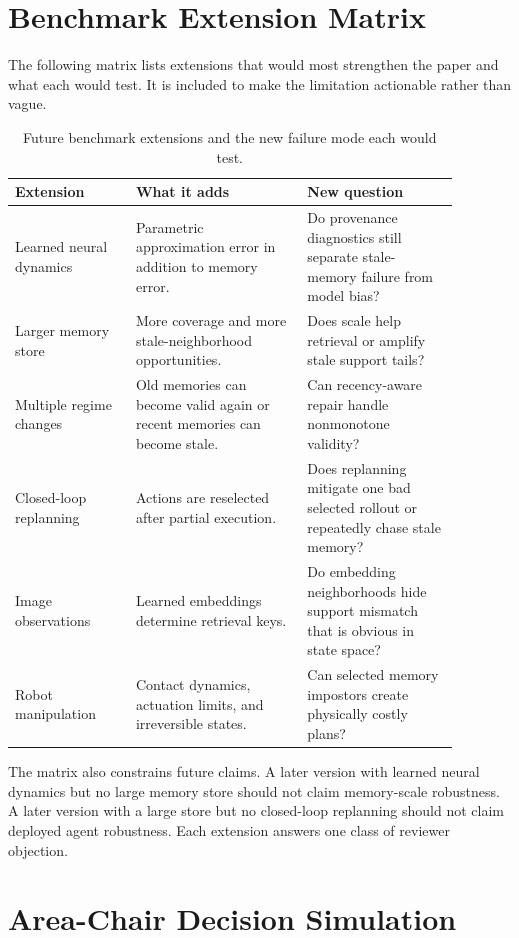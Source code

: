 \documentclass{article}
\begin{document}
\section{Benchmark Extension Matrix}
\label{app:extension-matrix}

The following matrix lists extensions that would most strengthen the paper and
what each would test. It is included to make the limitation actionable rather
than vague.

\begin{table}[t]
\centering
\small
\caption{Future benchmark extensions and the new failure mode each would test.}
\label{tab:extension-matrix}
\begin{tabular}{p{0.24\linewidth}p{0.34\linewidth}p{0.30\linewidth}}
\toprule
Extension & What it adds & New question \\
\midrule
Learned neural dynamics &
Parametric approximation error in addition to memory error. &
Do provenance diagnostics still separate stale-memory failure from model bias? \\
Larger memory store &
More coverage and more stale-neighborhood opportunities. &
Does scale help retrieval or amplify stale support tails? \\
Multiple regime changes &
Old memories can become valid again or recent memories can become stale. &
Can recency-aware repair handle nonmonotone validity? \\
Closed-loop replanning &
Actions are reselected after partial execution. &
Does replanning mitigate one bad selected rollout or repeatedly chase stale
memory? \\
Image observations &
Learned embeddings determine retrieval keys. &
Do embedding neighborhoods hide support mismatch that is obvious in state
space? \\
Robot manipulation &
Contact dynamics, actuation limits, and irreversible states. &
Can selected memory impostors create physically costly plans? \\
\bottomrule
\end{tabular}
\end{table}

The matrix also constrains future claims. A later version with learned neural
dynamics but no large memory store should not claim memory-scale robustness. A
later version with a large store but no closed-loop replanning should not
claim deployed agent robustness. Each extension answers one class of reviewer
objection.

\section{Area-Chair Decision Simulation}
\label{app:ac-simulation}
\end{document}
